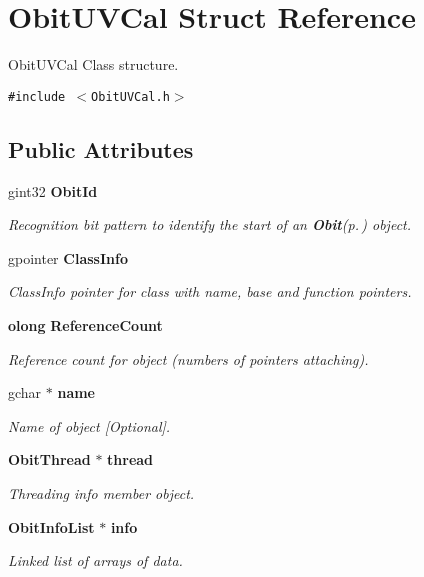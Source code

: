 \section{Obit\-UVCal Struct Reference}
\label{structObitUVCal}
Obit\-UVCal Class structure.  


{\tt \#include $<$Obit\-UVCal.h$>$}

\subsection*{Public Attributes}
\begin{CompactItemize}
\item 
gint32 {\bf Obit\-Id}
\begin{CompactList}\small\item\em Recognition bit pattern to identify the start of an {\bf Obit}{\rm (p.\,\pageref{structObit})} object. \item\end{CompactList}\item 
gpointer {\bf Class\-Info}
\begin{CompactList}\small\item\em Class\-Info pointer for class with name, base and function pointers. \item\end{CompactList}\item 
{\bf olong} {\bf Reference\-Count}
\begin{CompactList}\small\item\em Reference count for object (numbers of pointers attaching). \item\end{CompactList}\item 
gchar $\ast$ {\bf name}
\begin{CompactList}\small\item\em Name of object [Optional]. \item\end{CompactList}\item 
{\bf Obit\-Thread} $\ast$ {\bf thread}
\begin{CompactList}\small\item\em Threading info member object. \item\end{CompactList}\item 
{\bf Obit\-Info\-List} $\ast$ {\bf info}
\begin{CompactList}\small\item\em Linked list of arrays of data. \item\end{CompactList}\item 

\end{CompactItemize}
